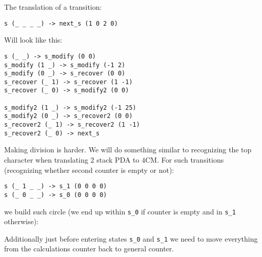 \documentclass[english,shortabstract,mgr]{iithesis}
\begin{document}
The translation of a transition:
\begin{verbatim}
s (_ _ _ _) -> next_s (1 0 2 0)
\end{verbatim}

Will look like this:
\begin{verbatim}
s (_ _) -> s_modify (0 0)
s_modify (1 _) -> s_modify (-1 2)
s_modify (0 _) -> s_recover (0 0)
s_recover (_ 1) -> s_recover (1 -1)
s_recover (_ 0) -> s_modify2 (0 0)

s_modify2 (1 _) -> s_modify2 (-1 25)
s_modify2 (0 _) -> s_recover2 (0 0)
s_recover2 (_ 1) -> s_recover2 (1 -1)
s_recover2 (_ 0) -> next_s
\end{verbatim}


Making division is harder. We will do something similar to recognizing the top
character when translating $2$ stack PDA to $4$CM. For such transitions (recognizing
whether second counter is empty or not):
\begin{verbatim}
s (_ 1 _ _) -> s_1 (0 0 0 0)
s (_ 0 _ _) -> s_0 (0 0 0 0)
\end{verbatim}

we build such circle (we end up within \texttt{s\_0} if counter is empty and in \texttt{s\_1} otherwise):

\begin{center}
\end{center}

Additionally just before entering states \texttt{s\_0} and \texttt{s\_1}
we need to move everything from the calculations counter back to general counter.
\end{document}

